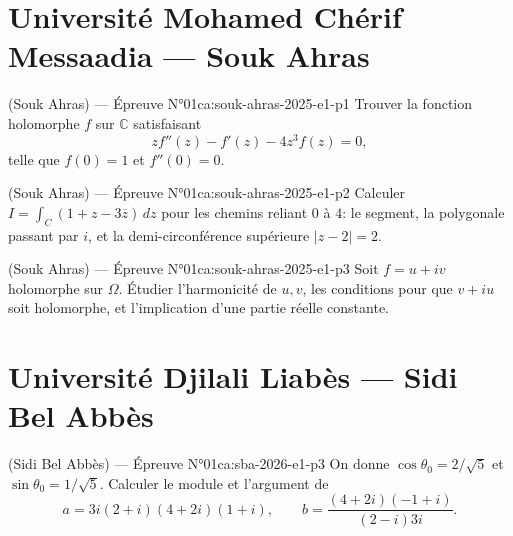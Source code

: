 \section{Université Mohamed Chérif Messaadia --- Souk Ahras}
\begin{problem}{(Souk Ahras) — Épreuve N°01}{ca:souk-ahras-2025-e1-p1}
Trouver la fonction holomorphe $f$ sur $\mathbb{C}$ satisfaisant
$$zf''(z)-f'(z)-4z^3f(z)=0,$$
telle que $f(0)=1$ et $f''(0)=0$.
\end{problem}
\newpage
\begin{problem}{(Souk Ahras) — Épreuve N°01}{ca:souk-ahras-2025-e1-p2}
Calculer $I=\int_C(1+z-3\overline z)\,dz$ pour les chemins reliant $0$ à $4$: le segment, la polygonale passant par $i$, et la demi-circonférence supérieure $|z-2|=2$.
\end{problem}
\newpage
\begin{problem}{(Souk Ahras) — Épreuve N°01}{ca:souk-ahras-2025-e1-p3}
Soit $f=u+iv$ holomorphe sur $\Omega$. Étudier l'harmonicité de $u,v$, les conditions pour que $v+iu$ soit holomorphe, et l'implication d'une partie réelle constante.
\end{problem}
\newpage

\section{Université Djilali Liabès --- Sidi Bel Abbès}
\begin{problem}{(Sidi Bel Abbès) — Épreuve N°01}{ca:sba-2026-e1-p3}
On donne $\cos\theta_0=2/\sqrt5$ et $\sin\theta_0=1/\sqrt5$. Calculer le module et l'argument de
$$a=3i(2+i)(4+2i)(1+i),\qquad b=\frac{(4+2i)(-1+i)}{(2-i)3i}.$$
\end{problem}
